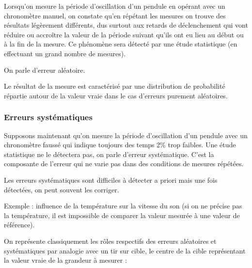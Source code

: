 Lorsqu'on mesure la période d'oscillation d'un pendule en opérant avec un chronomètre manuel, on constate qu'en répétant les mesures on trouve des résultats légèrement différents, dus surtout aux retards de déclenchement qui vont réduire ou accroître la valeur de la période suivant qu'ils ont eu lieu au début ou à la fin de la mesure. Ce phénomène sera détecté par une étude statistique (en effectuant un grand nombre de mesures).

On parle d'erreur aléatoire.

Le résultat de la mesure est caractérisé par une distribution de probabilité répartie autour de la valeur vraie dans le cas d'erreurs purement aléatoires.

\subsubsection{Erreurs systématiques}

Supposons maintenant qu'on mesure la période d'oscillation d'un pendule avec un chronomètre faussé qui indique toujours des temps 2\% trop faibles. Une étude statistique ne le détectera pas, on parle d'erreur systématique. C'est la composante de l'erreur qui ne varie pas dans des conditions de mesures répétées.

Les erreurs systématiques sont difficiles à détecter a priori mais une fois détectées, on peut souvent les corriger.

Exemple : influence de la température sur la vitesse du son (si on ne précise pas la température, il est impossible de comparer la valeur mesurée à une valeur de référence).

On représente classiquement les rôles respectifs des erreurs aléatoires et systématiques par analogie avec un tir sur cible, le centre de la cible représentant la valeur vraie de la grandeur à mesurer :

